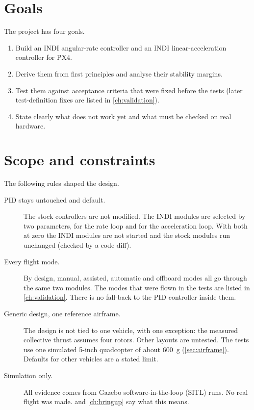 \section{Goals}\label{sec:goals}

The project has four goals.
\begin{enumerate}
  \item Build an INDI angular-rate controller and an INDI linear-acceleration controller for PX4.
  \item Derive them from first principles and analyse their stability margins.
  \item Test them against acceptance criteria that were fixed before the tests (later test-definition fixes are listed in \cref{ch:validation}).
  \item State clearly what does not work yet and what must be checked on real hardware.
\end{enumerate}

\section{Scope and constraints}\label{sec:scope}

The following rules shaped the design.
\begin{description}
  \item[PID stays untouched and default.] The stock controllers are not modified.
    The INDI modules are selected by two parameters,  for the rate loop and  for the acceleration loop.
    With both at zero the INDI modules are not started and the stock modules run unchanged (checked by a code diff).
  \item[Every flight mode.] By design, manual, assisted, automatic and offboard modes all go through the same two modules.
    The modes that were flown in the tests are listed in \cref{ch:validation}.
    There is no fall-back to the PID controller inside them.
  \item[Generic design, one reference airframe.] The design is not tied to one vehicle, with one exception: the measured collective thrust assumes four rotors.
    Other layouts are untested.
    The tests use one simulated 5-inch quadcopter of about 600~g (\cref{sec:airframe}).
    Defaults for other vehicles are a stated limit.
  \item[Simulation only.] All evidence comes from Gazebo software-in-the-loop (SITL) runs.
    No real flight was made.
     and \cref{ch:bringup} say what this means.
\end{description}

